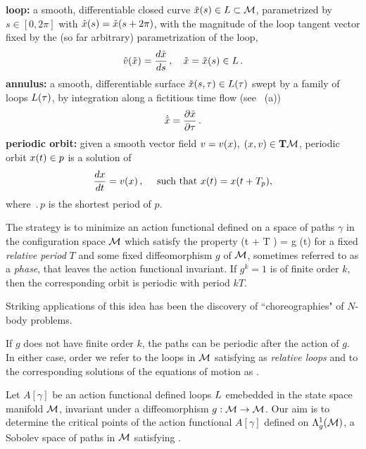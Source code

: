 \medskip
\noindent
{\bf loop:}
 a smooth, differentiable closed curve $\tilde{x}(s)\in L \subset 
{\cal M}$, 
parametrized by $s \in [0,2\pi]$ with $\tilde{x}(s)=\tilde{x}(s+2\pi)$, with the
magnitude of the loop tangent vector fixed by 
the (so far arbitrary) parametrization of the loop,
\[
\tilde{v}(\tilde{x})=\frac{d \tilde{x}}{ds}\,, \quad \tilde{x}=\tilde{x}(s) \in L
\,.
\]   
{\bf annulus:} 
 a smooth, differentiable surface $\tilde{x}(s,\tau)\in L(\tau)$ swept by a 
family of loops $L(\tau)$, by integration along a fictitious time flow
(see ~(a))
\[
\dot{\tilde{x}}=\frac{\partial \tilde{x}}{\partial \tau}
\,.
\]
{\bf periodic orbit:}
 given a smooth vector field $v=v(x),\; (x,v) \in {\bf T} {\cal M}$, periodic orbit $x(t) \in p$ is a solution of
\[
\frac{dx}{dt}=v(x) 
	\,,\quad
	\mbox{ such that } x(t)=x(t+{T_{p}}),
\] 
where $\period{p}$ is the shortest period of $p$.



The strategy
is to minimize an action functional defined on a space of paths $\gamma$ in the
configuration space ${\cal M}$ which satisfy the property
\beq
                               \gamma (t + T ) = g \cdot \gamma (t)                       
\label{McC1}
\eeq
for a fixed {\em relative period} $T$ and some fixed diffeomorphism $g$ of ${\cal M}$, 
sometimes referred to as a {\em phase}, that leaves the 
action functional invariant. If $g^k=1$ is of finite order
$k$, then the corresponding orbit is periodic with period $k T$. 

Striking applications of this idea has been the discovery
of ``choreographies" of $N$-body problems.

If $g$ does not have finite order $k$, the
paths can be periodic after the action of $g$. 
In either case, order we refer to the loops
in ${\cal M}$ satisfying  as 
{\em relative loops} and
to the corresponding solutions of the equations of motion
as {\em \rpo}. 

    Let $A[\gamma]$ be an action functional defined loops $L$
emebedded in the state space manifold ${\cal M}$, invariant
under a diffeomorphism $g : {\cal M} \to{\cal M}$. Our aim is to determine
the critical points of the action functional
$ %
	A[\gamma]
$ %
defined on $\Lambda_g^1({\cal M})$, a Sobolev space of paths in ${\cal M}$ satisfying 
.


